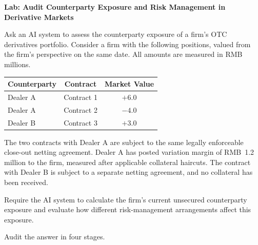 





\textbf{Lab: Audit Counterparty Exposure and Risk
Management in Derivative Markets}

Ask an AI system to assess the counterparty exposure
of a firm's OTC derivatives portfolio. Consider a
firm with the following positions, valued from the
firm's perspective on the same date. All amounts
are measured in RMB millions.

\begin{center}
\begin{tabular}{lcc}
\toprule
\textbf{Counterparty}
& \textbf{Contract}
& \textbf{Market Value} \\
\midrule
Dealer A & Contract 1 & $+6.0$ \\
Dealer A & Contract 2 & $-4.0$ \\
Dealer B & Contract 3 & $+3.0$ \\
\bottomrule
\end{tabular}
\end{center}

The two contracts with Dealer A are subject to
the same legally enforceable close-out netting
agreement. Dealer A has posted variation margin
of RMB~1.2 million to the firm, measured after
applicable collateral haircuts. The contract with
Dealer B is subject to a separate netting agreement,
and no collateral has been received.

Require the AI system to calculate the firm's
current unsecured counterparty exposure and
evaluate how different risk-management arrangements
affect this exposure.

Audit the answer in four stages.

